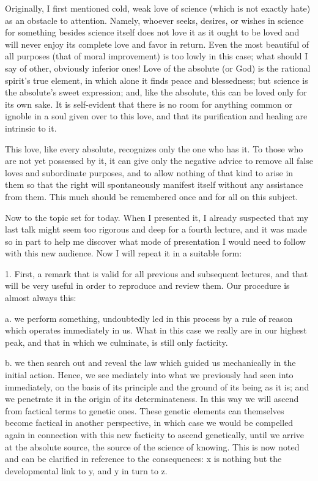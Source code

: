 Originally, I first mentioned cold, weak love of science
(which is not exactly hate) as an obstacle to attention.
Namely, whoever seeks, desires, or wishes in science
for something besides science itself does not love it
as it ought to be loved and will never enjoy
its complete love and favor in return.
Even the most beautiful of all purposes
(that of moral improvement)
is too lowly in this case;
what should I say of other, obviously inferior ones!
Love of the absolute (or God) is the rational spirit’s true element,
in which alone it finds peace and blessedness;
but science is the absolute’s sweet expression;
and, like the absolute, this can be loved only for its own sake.
It is self-evident that there is no room for anything
common or ignoble in a soul given over to this love,
and that its purification and healing are intrinsic to it.

This love, like every absolute,
recognizes only the one who has it.
To those who are not yet possessed by it,
it can give only the negative advice to remove
all false loves and subordinate purposes,
and to allow nothing of that kind to arise in them
so that the right will spontaneously manifest itself
without any assistance from them.
This much should be remembered
once and for all on this subject.

Now to the topic set for today.
When I presented it, I already suspected that
my last talk might seem too rigorous and
deep for a fourth lecture,
and it was made so in part to help me
discover what mode of presentation
I would need to follow with this new audience.
Now I will repeat it in a suitable form:

1. First, a remark that is valid
for all previous and subsequent lectures,
and that will be very useful in order
to reproduce and review them.
Our procedure is almost always this:

a. we perform something, undoubtedly led in this process
by a rule of reason which operates immediately in us.
What in this case we really are in our highest peak,
and that in which we culminate, is still only facticity.

b. we then search out and reveal the law
which guided us mechanically in the initial action.
Hence, we see mediately into what we previously
had seen into immediately,
on the basis of its principle
and the ground of its being as it is;
and we penetrate it in the origin
of its determinateness.
In this way we will ascend
from factical terms to genetic ones.
These genetic elements can themselves
become factical in another perspective,
in which case we would be compelled again
in connection with this new facticity
to ascend genetically,
until we arrive at the absolute source,
the source of the science of knowing.
This is now noted and can be clarified
in reference to the consequences:
x is nothing but the developmental link to y,
and y in turn to z.

